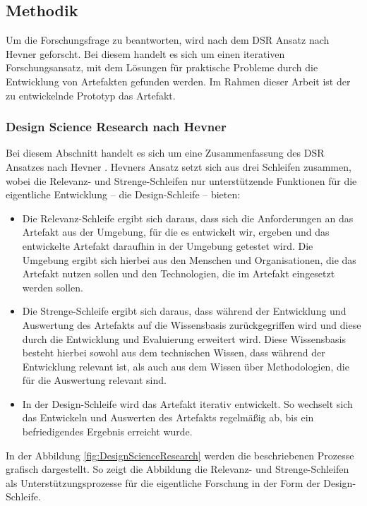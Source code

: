 \subsection{Methodik}
Um die Forschungsfrage zu beantworten, wird nach dem \ac{DSR} Ansatz nach Hevner \cite{Hevner2004} geforscht. Bei diesem handelt es sich um einen iterativen Forschungsansatz, mit dem Lösungen für praktische Probleme durch die Entwicklung von Artefakten gefunden werden. Im Rahmen dieser Arbeit ist der zu entwickelnde Prototyp das Artefakt.

\subsubsection{Design Science Research nach Hevner}
Bei diesem Abschnitt handelt es sich um eine Zusammenfassung des \ac{DSR} Ansatzes nach Hevner \cite[S.~79-81]{Hevner2004}. Hevners Ansatz setzt sich aus drei Schleifen zusammen, wobei die Relevanz- und Strenge-Schleifen nur unterstützende Funktionen für die eigentliche Entwicklung – die Design-Schleife – bieten:

\begin{itemize}
    \item Die Relevanz-Schleife ergibt sich daraus, dass sich die Anforderungen an das Artefakt aus der Umgebung, für die es entwickelt wir, ergeben und das entwickelte Artefakt daraufhin in der Umgebung getestet wird. Die Umgebung ergibt sich hierbei aus den Menschen und Organisationen, die das Artefakt nutzen sollen und den Technologien, die im Artefakt eingesetzt werden sollen.
    \item Die Strenge-Schleife ergibt sich daraus, dass während der Entwicklung und Auswertung des Artefakts auf die Wissensbasis zurückgegriffen wird und diese durch die Entwicklung und Evaluierung erweitert wird. Diese Wissensbasis besteht hierbei sowohl aus dem technischen Wissen, dass während der Entwicklung relevant ist, als auch aus dem Wissen über Methodologien, die für die Auswertung relevant sind.
    \item In der Design-Schleife wird das Artefakt iterativ entwickelt. So wechselt sich das Entwickeln und Auswerten des Artefakts regelmäßig ab, bis ein befriedigendes Ergebnis erreicht wurde.
\end{itemize}

In der Abbildung \ref{fig:DesignScienceResearch} werden die beschriebenen Prozesse grafisch dargestellt. So zeigt die Abbildung die Relevanz- und Strenge-Schleifen als Unterstützungsprozesse für die eigentliche Forschung in der Form der Design-Schleife.

